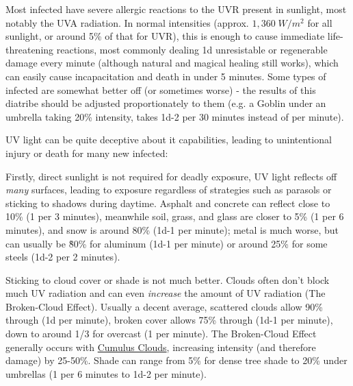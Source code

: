 \begin{multicols*}{3}
	Most infected have severe allergic reactions to the UVR present in sunlight, most notably the UVA radiation. In normal intensities (approx. $1,360\;W/m^2$ for all sunlight, or around 5\% of that for UVR), this is enough to cause immediate life-threatening reactions, most commonly dealing 1d unresistable or regenerable damage every minute (although natural and magical healing still works), which can easily cause incapacitation and death in under 5 minutes. Some types of infected are somewhat better off (or sometimes worse) - the results of this diatribe should be adjusted proportionately to them (e.g. a Goblin under an umbrella taking 20\% intensity, takes 1d-2 per 30 minutes instead of per minute).
	
	UV light can be quite deceptive about it capabilities, leading to unintentional injury or death for many new infected:
	
	Firstly, direct sunlight is not required for deadly exposure, UV light reflects off \textit{many} surfaces, leading to exposure regardless of strategies such as parasols or sticking to shadows during daytime. Asphalt and concrete can reflect close to 10\% (1 per 3 minutes), meanwhile soil, grass, and glass are closer to 5\% (1 per 6 minutes), and snow is around 80\% (1d-1 per minute); metal is much worse, but can usually be \~80\% for aluminum (1d-1 per minute) or around 25\% for some steels (1d-2 per 2 minutes).
	
	Sticking to cloud cover or shade is not much better. Clouds often don't block much UV radiation and can even \textit{increase} the amount of UV radiation (The Broken-Cloud Effect). Usually a decent average, scattered clouds allow 90\% through (1d per minute), broken cover allows 75\% through (1d-1 per minute), down to around 1/3 for overcast (1 per minute). The Broken-Cloud Effect generally occurs with \href{https://en.wikipedia.org/wiki/Cumulus_cloud}{Cumulus Clouds}, increasing intensity (and therefore damage) by 25-50\%.	Shade can range from 5\% for dense tree shade to 20\% under umbrellas (1 per 6 minutes to 1d-2 per minute).
	

\end{multicols*}
